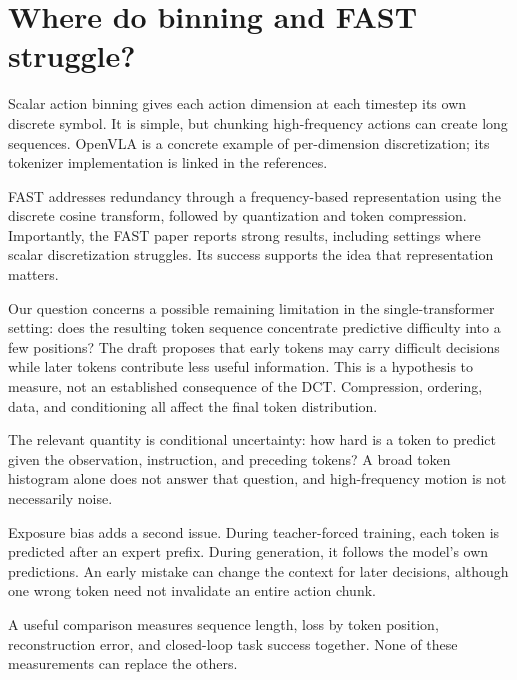 \section{Where do binning and FAST struggle?}

Scalar action binning gives each action dimension at each timestep its own
discrete symbol. It is simple, but chunking high-frequency actions can create
long sequences. OpenVLA is a concrete example of per-dimension discretization;
its tokenizer implementation is linked in the references.

FAST addresses redundancy through a frequency-based representation using the
discrete cosine transform, followed by quantization and token compression.
Importantly, the FAST paper reports strong results, including settings where
scalar discretization struggles. Its success supports the idea that
representation matters.

Our question concerns a possible remaining limitation in the single-transformer
setting: does the resulting token sequence concentrate predictive difficulty
into a few positions? The draft proposes that early tokens may carry difficult
decisions while later tokens contribute less useful information. This is a
hypothesis to measure, not an established consequence of the DCT. Compression,
ordering, data, and conditioning all affect the final token distribution.

The relevant quantity is conditional uncertainty: how hard is a token to predict
given the observation, instruction, and preceding tokens? A broad token
histogram alone does not answer that question, and high-frequency motion is not
necessarily noise.

Exposure bias adds a second issue. During teacher-forced training, each token is
predicted after an expert prefix. During generation, it follows the model’s own
predictions. An early mistake can change the context for later decisions,
although one wrong token need not invalidate an entire action chunk.

A useful comparison measures sequence length, loss by token position,
reconstruction error, and closed-loop task success together. None of these
measurements can replace the others.
